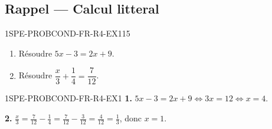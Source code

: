 

\subsection*{Rappel --- Calcul litteral}

\begin{exercice}{1SPE-PROBCOND-FR-R4-EX1}{1}{5}
\begin{enumerate}
  \item Résoudre $5x - 3 = 2x + 9$.
  \item Résoudre $\dfrac{x}{3} + \dfrac{1}{4} = \dfrac{7}{12}$.
\end{enumerate}
\end{exercice}


\begin{corrige}{1SPE-PROBCOND-FR-R4-EX1}
\textbf{1.} $5x - 3 = 2x + 9 \Leftrightarrow 3x = 12 \Leftrightarrow x = 4$.

\textbf{2.} $\frac{x}{3} = \frac{7}{12} - \frac{1}{4} = \frac{7}{12} - \frac{3}{12} = \frac{4}{12} = \frac{1}{3}$, donc $x = 1$.
\end{corrige}
